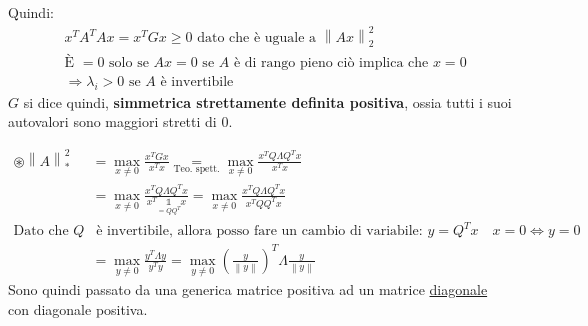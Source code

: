 \documentclass{article}
\begin{document}
Quindi:
\begin{align*}
     & x^TA^TAx=x^TGx\ge0\text{ dato che è uguale a }\left\|Ax\right\|^2_2                     \\
     & \text{È }=0\text{ solo se }Ax=0\text{ se }A\text{ è di rango pieno ciò implica che }x=0 \\
     & \Rightarrow \lambda_i>0\text{ se }A\text{ è invertibile}
\end{align*}
$G$ si dice quindi, \textbf{simmetrica strettamente definita positiva}, ossia tutti i suoi autovalori sono maggiori stretti di $0$.

\begin{align*}
    \circledast\left\|A\right\|_*^2 & =\max_{x\ne0}\frac{x^TGx}{x^Tx}\underset{\text{Teo. spett.}}{=}\max_{x\ne0}\frac{x^TQ\Lambda Q^Tx}{x^Tx}                      \\
                                    & =\max_{x\ne0}\frac{x^TQ\Lambda Q^Tx}{x^T\underset{=QQ^T}{\mathbb 1}x}=\max_{x\ne0}\frac{x^TQ\Lambda Q^Tx}{x^TQQ^Tx}           \\
    \text{Dato che }Q               & \text{ è invertibile, allora posso fare un cambio di variabile: }y=Q^Tx\quad x=0\Leftrightarrow y=0                           \\
                                    & =\max_{y\ne0}\frac{y^T\Lambda y}{y^Ty}=\max_{y\ne0}\left(\frac{y}{\left\|y\right\|}\right)^T\Lambda\frac{y}{\left\|y\right\|}
\end{align*}
Sono quindi passato da una generica matrice positiva ad un matrice \underline{diagonale} con diagonale positiva.
\end{document}
